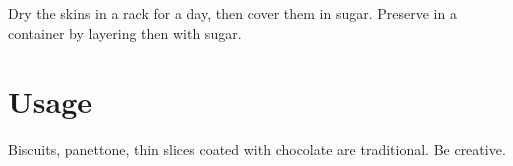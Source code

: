 Dry the skins in a rack for a day, then cover them in sugar. Preserve in a container by layering then with sugar.

\section{Usage}
Biscuits, panettone, thin slices coated with chocolate are traditional. Be creative.
